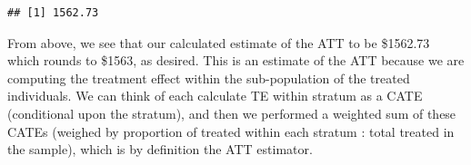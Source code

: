 \documentclass[
]{article}
\newenvironment{Shaded}{\begin{snugshade}}{\end{snugshade}}
\newcommand{\AttributeTok}[1]{\textcolor[rgb]{0.13,0.29,0.53}{#1}}
\newcommand{\ControlFlowTok}[1]{\textcolor[rgb]{0.13,0.29,0.53}{\textbf{#1}}}
\newcommand{\DecValTok}[1]{\textcolor[rgb]{0.00,0.00,0.81}{#1}}
\newcommand{\FunctionTok}[1]{\textcolor[rgb]{0.13,0.29,0.53}{\textbf{#1}}}
\newcommand{\NormalTok}[1]{#1}
\newcommand{\OtherTok}[1]{\textcolor[rgb]{0.56,0.35,0.01}{#1}}
\newcommand{\SpecialCharTok}[1]{\textcolor[rgb]{0.81,0.36,0.00}{\textbf{#1}}}
\begin{document}
\begin{Shaded}
\end{Shaded}

\begin{verbatim}
## [1] 1562.73
\end{verbatim}

From above, we see that our calculated estimate of the ATT to be
\$1562.73 which rounds to \$1563, as desired. This is an estimate of the
ATT because we are computing the treatment effect within the
sub-population of the treated individuals. We can think of each
calculate TE within stratum as a CATE (conditional upon the stratum),
and then we performed a weighted sum of these CATEs (weighed by
proportion of treated within each stratum : total treated in the
sample), which is by definition the ATT estimator.
\end{document}

